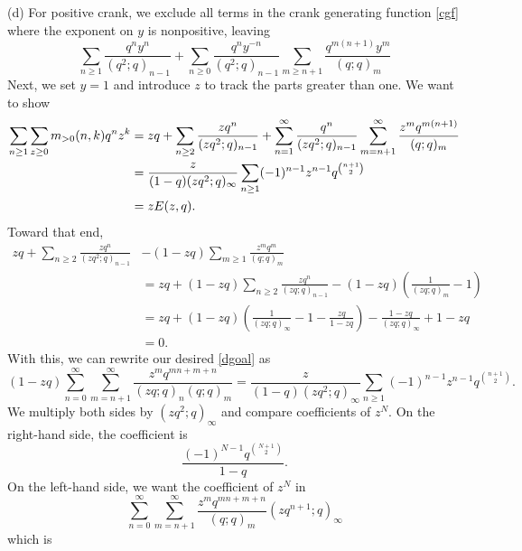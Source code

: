 \documentclass{amsart}
\theoremstyle{theorem}
\theoremstyle{definition}
\begin{document}
 (d) For positive crank, we exclude all terms in the crank generating function \eqref{cgf} where the exponent on $y$ is nonpositive, leaving
 \[ \sum_{n \ge 1} \frac{q^n y^n}{(q^2;q)_{n-1}} + \sum_{n \ge 0} \frac{q^n y^{-n}}{(q^2;q)_{n-1}} \sum_{m \ge n+1} \frac{q^{m(n+1)} y^m}{(q;q)_m} \]
 Next, we set $y=1$ and introduce $z$ to track the parts greater than one.  We want to show
\begin{align}
\sum_{n \ge 1} \sum_{z \ge 0} m_{>0}(n,k) q^n z^k & = zq + \sum_{n \ge 2} \frac{z q^n}{(zq^2;q)_{n-1}} + \sum_{n = 1}^\infty \frac{q^n}{(zq^2;q)_{n-1}} \sum_{m = n+1}^\infty \frac{z^m q^{m(n+1)}}{(q;q)_m} \notag \\
& = \frac{z}{(1-q)(zq^2;q)_\infty} \sum_{n \ge 1} (-1)^{n-1} z^{n-1} q^{\binom{n+1}{2}} \notag \\
& = zE(z,q). \label{dgoal}
\end{align}
Toward that end, 
\begin{align*}
zq + \sum_{n \ge 2} \frac{z q^n}{(zq^2;q)_{n-1}} & - (1-zq) \sum_{m \ge 1} \frac{z^m q^m}{(q;q)_m} \\
& = zq  +(1-zq)  \sum_{n \ge 2}  \frac{z q^n}{(zq;q)_{n-1}} - (1-zq) \left(\frac{1}{(zq;q)_m} - 1 \right) \\
& = zq + (1-zq) \left( \frac{1}{(zq;q)_\infty} - 1 - \frac{zq}{1-zq} \right) - \frac{1-zq}{(zq;q)_\infty} +1 - zq \\
& = 0.
\end{align*}
With this, we can rewrite our desired \eqref{dgoal} as
\[(1-zq) \sum_{n=0}^\infty \sum_{m=n+1}^\infty \frac{z^m q^{mn+m+n}}{(zq;q)_n (q;q)_m} = \frac{z}{(1-q)(zq^2;q)_\infty} \sum_{n \ge 1} (-1)^{n-1} z^{n-1} q^{\binom{n+1}{2}}. \]
We multiply both sides by $(zq^2;q)_\infty$ and compare coefficients of $z^N$.  On the right-hand side, the coefficient is
\[ \frac{(-1)^{N-1} q^{\binom{N+1}{2}}}{1-q}.\]
On the left-hand side, we want the coefficient of $z^N$ in
\[ \sum_{n=0}^\infty \sum_{m=n+1}^\infty \frac{z^m q^{mn+m+n}}{(q;q)_m} (zq^{n+1};q)_\infty\]
which is 
\end{document}
